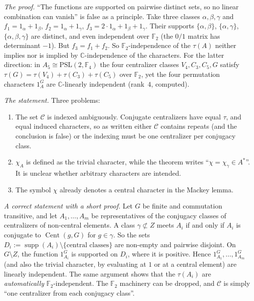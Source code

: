 \documentclass[12pt,letterpaper]{article}
\newcommand{\F}{\mathbb{F}}
\newcommand{\C}{\mathbb{C}}
\newcommand{\Cent}{\operatorname{Cent}}
\newcommand{\supp}{\operatorname{supp}}
\newcommand{\PSL}{\mathrm{PSL}}
\theoremstyle{definition}
\begin{document}
\emph{The proof.} ``The functions are supported on pairwise distinct
sets, so no linear combination can vanish'' is false as a principle.
Take three classes $\alpha,\beta,\gamma$ and $f_1=1_\alpha+1_\beta$,
$f_2=1_\alpha+1_\gamma$, $f_3=2\cdot1_\alpha+1_\beta+1_\gamma$. Their
supports $\{\alpha,\beta\}$, $\{\alpha,\gamma\}$,
$\{\alpha,\beta,\gamma\}$ are distinct, and even independent over $\F_2$
(the $0/1$ matrix has determinant $-1$). But $f_3=f_1+f_2$. So
$\F_2$-independence of the $\tau(A)$ neither implies nor is implied by
$\C$-independence of the characters. For the latter direction: in
$A_5\cong\PSL(2,\F_4)$ the four centralizer classes $V_4,C_3,C_5,G$
satisfy $\tau(G)=\tau(V_4)+\tau(C_3)+\tau(C_5)$ over $\F_2$, yet the
four permutation characters $1_A^G$ are $\C$-linearly independent
(rank~$4$, computed).

\emph{The statement.} Three problems:
\begin{enumerate}[label=(\roman*),itemsep=1pt]
\item The set $\mathcal C$ is indexed ambiguously. Conjugate centralizers
  have equal $\tau$, and equal induced characters, so as written either
  $\mathcal C$ contains repeats (and the conclusion is false) or the
  indexing must be one centralizer per conjugacy class.
\item $\chi_A$ is defined as the trivial character, while the theorem
  writes ``$\chi=\chi_\gamma\in A^*$''. It is unclear whether arbitrary
  characters are intended.
\item The symbol $\chi$ already denotes a central character in the
  Mackey lemma.
\end{enumerate}

\emph{A correct statement with a short proof.} Let $G$ be finite and
commutation transitive, and let $A_1,\dots,A_m$ be representatives of
the conjugacy classes of centralizers of non-central elements. A class
$\gamma\not\subset Z$ meets $A_i$ if and only if $A_i$ is conjugate to
$\Cent(g,G)$ for $g\in\gamma$. So the sets $D_i:=\supp(A_i)\setminus
\{\text{central classes}\}$ are non-empty and pairwise disjoint. On
$G\setminus Z$, the function $1_{A_i}^G$ is supported on $D_i$, where it
is positive. Hence $1_{A_1}^G,\dots,1_{A_m}^G$ (and also the trivial
character, by evaluating at $1$ or at a central element) are linearly
independent. The same argument shows that the $\tau(A_i)$ are
\emph{automatically} $\F_2$-independent. The $\F_2$ machinery can be
dropped, and $\mathcal C$ is simply ``one centralizer from each
conjugacy class''.
\end{document}
